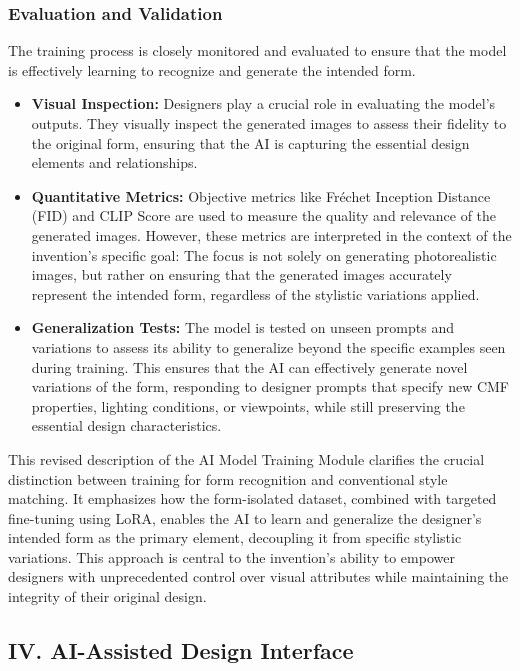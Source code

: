 \documentclass{article}
\begin{document}
\begin{itemize}
\subsubsection{Evaluation and Validation}
The training process is closely monitored and evaluated to ensure that the model is effectively learning to recognize and generate the intended form.

\begin{itemize}
    \item \textbf{Visual Inspection:} Designers play a crucial role in evaluating the model's outputs. They visually inspect the generated images to assess their fidelity to the original form, ensuring that the AI is capturing the essential design elements and relationships.
    \item \textbf{Quantitative Metrics:} Objective metrics like Fréchet Inception Distance (FID) and CLIP Score are used to measure the quality and relevance of the generated images. However, these metrics are interpreted in the context of the invention's specific goal: The focus is not solely on generating photorealistic images, but rather on ensuring that the generated images accurately represent the intended form, regardless of the stylistic variations applied.
    \item \textbf{Generalization Tests:} The model is tested on unseen prompts and variations to assess its ability to generalize beyond the specific examples seen during training. This ensures that the AI can effectively generate novel variations of the form, responding to designer prompts that specify new CMF properties, lighting conditions, or viewpoints, while still preserving the essential design characteristics.
\end{itemize}

This revised description of the AI Model Training Module clarifies the crucial distinction between training for form recognition and conventional style matching. It emphasizes how the form-isolated dataset, combined with targeted fine-tuning using LoRA, enables the AI to learn and generalize the designer's intended form as the primary element, decoupling it from specific stylistic variations. This approach is central to the invention's ability to empower designers with unprecedented control over visual attributes while maintaining the integrity of their original design.

\subsection{IV. AI-Assisted Design Interface}


\end{itemize}
\end{document}

